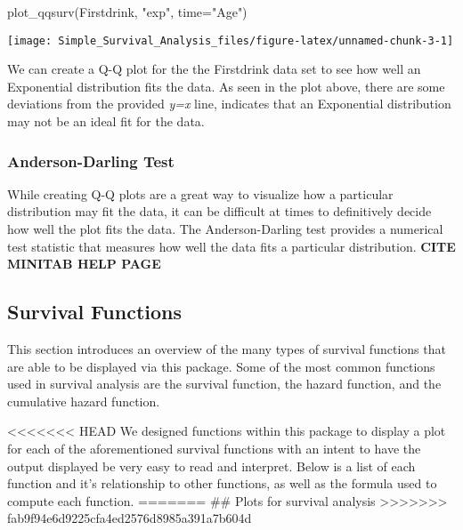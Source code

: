 \begin{Schunk}
\begin{Sinput}
plot_qqsurv(Firstdrink, "exp", time="Age")
\end{Sinput}

\texttt{[image: Simple\_Survival\_Analysis\_files/figure-latex/unnamed-chunk-3-1]} \end{Schunk}

We can create a Q-Q plot for the the Firstdrink data set to see how well
an Exponential distribution fits the data. As seen in the plot above,
there are some deviations from the provided \emph{y=x} line, indicates
that an Exponential distribution may not be an ideal fit for the data.

\hypertarget{anderson-darling-test}{%
\subsubsection{Anderson-Darling Test}\label{anderson-darling-test}}

While creating Q-Q plots are a great way to visualize how a particular
distribution may fit the data, it can be difficult at times to
definitively decide how well the plot fits the data. The
Anderson-Darling test provides a numerical test statistic that measures
how well the data fits a particular distribution. \textbf{CITE MINITAB
HELP PAGE}

\hypertarget{survival-functions}{%
\subsection{Survival Functions}\label{survival-functions}}

This section introduces an overview of the many types of survival
functions that are able to be displayed via this package. Some of the
most common functions used in survival analysis are the survival
function, the hazard function, and the cumulative hazard function.

\textless{}\textless{}\textless{}\textless{}\textless{}\textless{}\textless{}
HEAD We designed functions within this package to display a plot for
each of the aforementioned survival functions with an intent to have the
output displayed be very easy to read and interpret. Below is a list of
each function and it's relationship to other functions, as well as the
formula used to compute each function. ======= \#\# Plots for survival
analysis
\textgreater{}\textgreater{}\textgreater{}\textgreater{}\textgreater{}\textgreater{}\textgreater{}
fab9f94e6d9225cfa4ed2576d8985a391a7b604d

